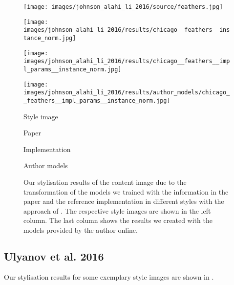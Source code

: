 \begin{figure}[H]
\begin{minipage}[t]{0.24\textwidth}
    	\centering
    	\texttt{[image: images/johnson\_alahi\_li\_2016/source/feathers.jpg]}
    \end{minipage}
    \hfill%
    \begin{minipage}[t]{0.24\textwidth}
    	\centering
    	\texttt{[image: images/johnson\_alahi\_li\_2016/results/chicago\_\_feathers\_\_instance\_norm.jpg]}
    \end{minipage}
    \hfill%
    \begin{minipage}[t]{0.24\textwidth}
    	\centering
    	\texttt{[image: images/johnson\_alahi\_li\_2016/results/chicago\_\_feathers\_\_impl\_params\_\_instance\_norm.jpg]}
    \end{minipage}
    \hfill%
    \begin{minipage}[t]{0.24\textwidth}
    	\centering
    	\texttt{[image: images/johnson\_alahi\_li\_2016/results/author\_models/chicago\_\_feathers\_\_impl\_params\_\_instance\_norm.jpg]}
    \end{minipage}
	\hfill%
	\begin{minipage}[t]{0.24\textwidth}
		\centering
		Style image
	\end{minipage}
	\hfill%
	\begin{minipage}[t]{0.24\textwidth}
		\centering
		Paper
	\end{minipage}
	\hfill%
	\begin{minipage}[t]{0.24\textwidth}
		\centering
		Implementation
	\end{minipage}
	\hfill%
	\begin{minipage}[t]{0.24\textwidth}
		\centering
		Author models
	\end{minipage}
	\caption{Our stylisation results of the content image due to the transformation of the models we trained with the information in the paper and the reference implementation in different styles with the approach of \cite{JAL2016}. The respective style images are shown in the left column. The last column shows the results we created with the models provided by the author online.}
	\label{fig:johnson_alahi_li_2016_fig}
\end{figure}


\subsection{Ulyanov et al. 2016}

Our stylisation results for some exemplary style images are shown in . 

